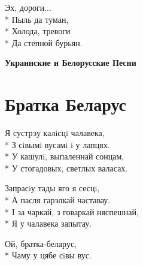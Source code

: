 \medskip

\begin{minipage}{\linewidth}
\hspace*{1.5em}Эх, дороги...\\*
\hspace*{1.5em}Пыль да туман,\\*
\hspace*{1.5em}Холода, тревоги\\*
\hspace*{1.5em}Да степной бурьян.\\
\end{minipage}

\vspace{\fill}\newpage

\cleardoublepage
\thispagestyle{empty}
\vspace*{\fill}
{\centering\huge\bfseries Украинские и Белорусские Песни\par}
\vspace*{\fill}
\newpage
\section{Братка Беларус}
\label{song:Братка_Беларус}

\medskip

\begin{minipage}{\linewidth}
Я сустрэу калiсцi чалавека,\\*
З сiвымi вусамi i у лапцях.\\*
У кашулi, выпаленнай сонцам,\\*
У стогадовых, светлых валасах.\\
\end{minipage}\par\medskip\nobreak

\medskip

\begin{minipage}{\linewidth}
Запрасiу тады яго я сесцi,\\*
А пасля гарэлкай частавау.\\*
I за чаркай, з говаркай няспешнай,\\*
Я у чалавека запытау.\\
\end{minipage}\par\medskip\nobreak

\medskip

\begin{minipage}{\linewidth}
\hspace*{1.5em}Ой, братка-беларус,\\*
\hspace*{1.5em}Чаму у цябе сiвы вус.\\
\end{minipage}\par\medskip\nobreak

